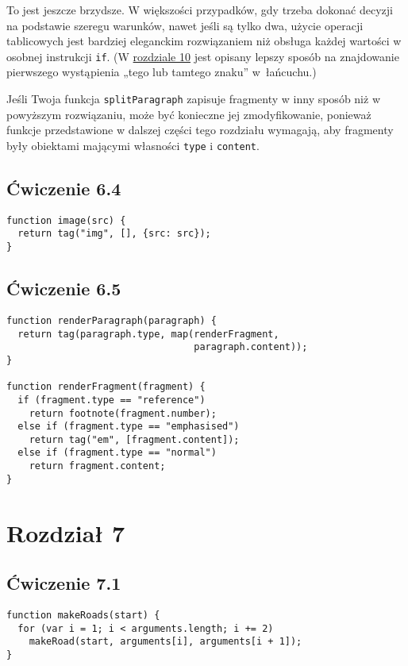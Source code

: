 To jest jeszcze brzydsze. W większości przypadków, gdy trzeba dokonać decyzji na podstawie szeregu warunków, nawet jeśli są tylko dwa, użycie operacji tablicowych jest bardziej eleganckim rozwiązaniem niż obsługa każdej wartości w osobnej instrukcji \texttt{if}. (W \hyperref[chap:10]{rozdziale 10} jest opisany lepszy sposób na znajdowanie pierwszego wystąpienia „tego lub tamtego znaku” w~łańcuchu.)

    
Jeśli Twoja funkcja \texttt{splitParagraph} zapisuje fragmenty w inny sposób niż w powyższym rozwiązaniu, może być konieczne jej zmodyfikowanie, ponieważ funkcje przedstawione w dalszej części tego rozdziału wymagają, aby fragmenty były obiektami mającymi własności \texttt{type} i \texttt{content}.

  
\subsection*{Ćwiczenie 6.4}
\label{sol:6.4}
    
\begin{verbatim} 
function image(src) {
  return tag("img", [], {src: src});
}
 \end{verbatim}

  
\subsection*{Ćwiczenie 6.5}
\label{sol:6.5}
    
\begin{verbatim} 
function renderParagraph(paragraph) {
  return tag(paragraph.type, map(renderFragment,
                                 paragraph.content));
}

function renderFragment(fragment) {
  if (fragment.type == "reference")
    return footnote(fragment.number);
  else if (fragment.type == "emphasised")
    return tag("em", [fragment.content]);
  else if (fragment.type == "normal")
    return fragment.content;
}
\end{verbatim}

\section*{Rozdział 7}
\label{sol:7}

\subsection*{Ćwiczenie 7.1}
\label{sol:7.1}
    
\begin{verbatim} 
function makeRoads(start) {
  for (var i = 1; i < arguments.length; i += 2)
    makeRoad(start, arguments[i], arguments[i + 1]);
}
\end{verbatim}
    
